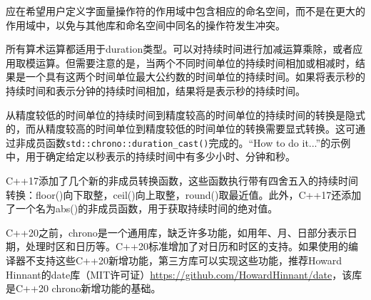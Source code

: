 \begin{myTip}
应在希望用户定义字面量操作符的作用域中包含相应的命名空间，而不是在更大的作用域中，以免与其他库和命名空间中同名的操作符发生冲突。
\end{myTip}

所有算术运算都适用于duration类型。可以对持续时间进行加减运算乘除，或者应用取模运算。但需要注意的是，当两个不同时间单位的持续时间相加或相减时，结果是一个具有这两个时间单位最大公约数的时间单位的持续时间。如果将表示秒的持续时间和表示分钟的持续时间相加，结果将是表示秒的持续时间。

从精度较低的时间单位的持续时间到精度较高的时间单位的持续时间的转换是隐式的，而从精度较高的时间单位到精度较低的时间单位的转换需要显式转换。这可通过非成员函数\verb|std::chrono::duration_cast()|完成的。“How to do it...”的示例中，用于确定给定以秒表示的持续时间中有多少小时、分钟和秒。

C++17添加了几个新的非成员转换函数，这些函数执行带有四舍五入的持续时间转换：floor()向下取整，ceil()向上取整，round()取最近值。此外，C++17还添加了一个名为abs()的非成员函数，用于获取持续时间的绝对值。


C++20之前，chrono是一个通用库，缺乏许多功能，如用年、月、日部分表示日期，处理时区和日历等。C++20标准增加了对日历和时区的支持。如果使用的编译器不支持这些C++20新增功能，第三方库可以实现这些功能，推荐Howard Hinnant的date库（MIT许可证）\url{https://github.com/HowardHinnant/date}，该库是C++20 chrono新增功能的基础。
